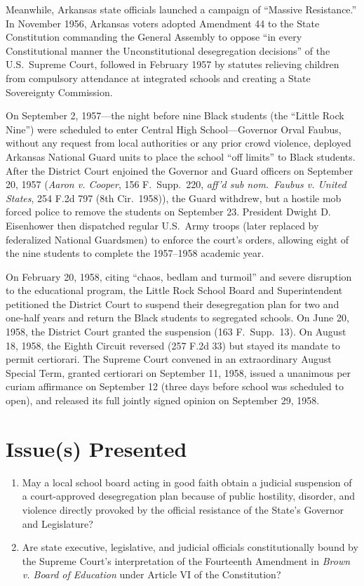 \documentclass[12pt]{article}
\begin{document}
Meanwhile, Arkansas state officials launched a campaign of ``Massive Resistance.'' In November 1956, Arkansas voters adopted Amendment 44 to the State Constitution commanding the General Assembly to oppose ``in every Constitutional manner the Unconstitutional desegregation decisions'' of the U.S.\ Supreme Court, followed in February 1957 by statutes relieving children from compulsory attendance at integrated schools and creating a State Sovereignty Commission.

On September 2, 1957---the night before nine Black students (the ``Little Rock Nine'') were scheduled to enter Central High School---Governor Orval Faubus, without any request from local authorities or any prior crowd violence, deployed Arkansas National Guard units to place the school ``off limits'' to Black students. After the District Court enjoined the Governor and Guard officers on September 20, 1957 (\textit{Aaron v. Cooper}, 156 F.\ Supp.\ 220, \textit{aff'd sub nom.\ Faubus v. United States}, 254 F.2d 797 (8th Cir.\ 1958)), the Guard withdrew, but a hostile mob forced police to remove the students on September 23. President Dwight D. Eisenhower then dispatched regular U.S.\ Army troops (later replaced by federalized National Guardsmen) to enforce the court's orders, allowing eight of the nine students to complete the 1957--1958 academic year.

On February 20, 1958, citing ``chaos, bedlam and turmoil'' and severe disruption to the educational program, the Little Rock School Board and Superintendent petitioned the District Court to suspend their desegregation plan for two and one-half years and return the Black students to segregated schools. On June 20, 1958, the District Court granted the suspension (163 F.\ Supp.\ 13). On August 18, 1958, the Eighth Circuit reversed (257 F.2d 33) but stayed its mandate to permit certiorari. The Supreme Court convened in an extraordinary August Special Term, granted certiorari on September 11, 1958, issued a unanimous per curiam affirmance on September 12 (three days before school was scheduled to open), and released its full jointly signed opinion on September 29, 1958.

\section{Issue(s) Presented}
\begin{enumerate}
  \item May a local school board acting in good faith obtain a judicial suspension of a court-approved desegregation plan because of public hostility, disorder, and violence directly provoked by the official resistance of the State's Governor and Legislature?
  \item Are state executive, legislative, and judicial officials constitutionally bound by the Supreme Court's interpretation of the Fourteenth Amendment in \textit{Brown v. Board of Education} under Article VI of the Constitution?
\end{enumerate}
\end{document}

